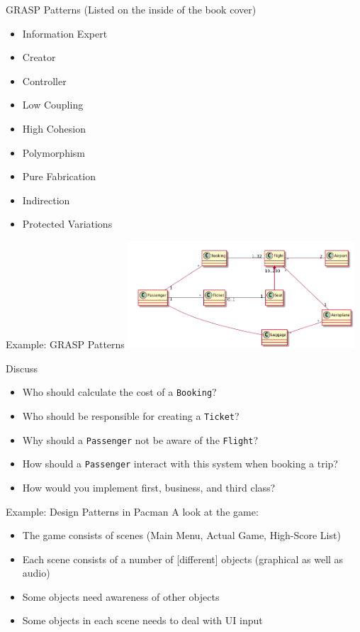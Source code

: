 \documentclass[10pt,t,a4paper]{beamer}
\begin{document}
\begin{frame}[label=sec-1-3]{GRASP Patterns}
(Listed on the inside of the book cover)
\begin{itemize}
\item Information Expert
\item Creator
\item Controller
\item Low Coupling
\item High Cohesion
\item Polymorphism
\item Pure Fabrication
\item Indirection
\item Protected Variations
\end{itemize}
\end{frame}
\begin{frame}[fragile,label=sec-1-4]{Example: GRASP Patterns}
 \vspace{-1cm}\hspace{2cm}
\includegraphics[height=4cm]{FGRASPExample.png}

\begin{block}{Discuss}
\begin{itemize}
\item Who should calculate the cost of a \texttt{Booking}?
\item Who should be responsible for creating a \texttt{Ticket}?
\item Why should a \texttt{Passenger} not be aware of the \texttt{Flight}?
\item How should a \texttt{Passenger} interact with this system when booking a trip?
\item How would you implement first, business, and third class?
\end{itemize}
\end{block}
\end{frame}

\begin{frame}[label=sec-1-5]{Example: Design Patterns in Pacman}
A look at the game:

\begin{itemize}
\item The game consists of scenes (Main Menu, Actual Game, High-Score List)
\item Each scene consists of a number of [different] objects (graphical as well as audio)
\item Some objects need awareness of other objects
\item Some objects in each scene needs to deal with UI input
\end{itemize}
\end{frame}
\end{document}
